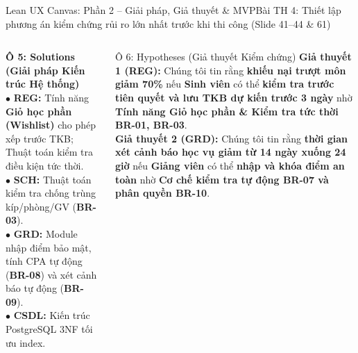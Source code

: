 \documentclass[aspectratio=169, 10pt]{beamer}
\begin{document}
\begin{frame}[t]{Lean UX Canvas: Phần 2 -- Giải pháp, Giả thuyết \& MVP}{Bài TH 4: Thiết lập phương án kiểm chứng rủi ro lớn nhất trước khi thi công (Slide 41--44 \& 61)}
  \vspace{-0.25cm}
  \begin{columns}[T]
      \begin{neutralBox}
        \tiny
        \textbf{\color{PrimaryBlue}Ô 5: Solutions (Giải pháp Kiến trúc Hệ thống)}\\
        $\bullet$ \textbf{REG:} Tính năng \textbf{Giỏ học phần (Wishlist)} cho phép xếp trước TKB; Thuật toán kiểm tra điều kiện tức thời.\\
        $\bullet$ \textbf{SCH:} Thuật toán kiểm tra chống trùng kíp/phòng/GV (\textbf{BR-03}).\\
        $\bullet$ \textbf{GRD:} Module nhập điểm bảo mật, tính CPA tự động (\textbf{BR-08}) và xét cảnh báo tự động (\textbf{BR-09}).\\
        $\bullet$ \textbf{CSDL:} Kiến trúc PostgreSQL 3NF tối ưu index.
      \end{neutralBox}
      \vspace{-0.2cm}
      \begin{infoCard}{Ô 6: Hypotheses (Giả thuyết Kiểm chứng)}
        \tiny
        \textbf{Giả thuyết 1 (REG):} Chúng tôi tin rằng \textbf{khiếu nại trượt môn giảm 70\%} nếu \textbf{Sinh viên} có thể \textbf{kiểm tra trước tiên quyết và lưu TKB dự kiến trước 3 ngày} nhờ \textbf{Tính năng Giỏ học phần \& Kiểm tra tức thời BR-01, BR-03}.\\[0.05cm]
        \textbf{Giả thuyết 2 (GRD):} Chúng tôi tin rằng \textbf{thời gian xét cảnh báo học vụ giảm từ 14 ngày xuống 24 giờ} nếu \textbf{Giảng viên} có thể \textbf{nhập và khóa điểm an toàn} nhờ \textbf{Cơ chế kiểm tra tự động BR-07 và phân quyền BR-10}.
      \end{infoCard}


\end{columns}
\end{frame}
\end{document}
